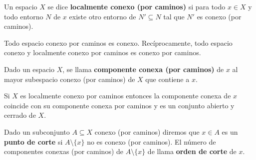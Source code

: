 \documentclass[GTS.tex]{subfiles}
\begin{document}
\begin{defi}
Un espacio $X$ se dice \textbf{localmente conexo (por caminos)} si para todo $x\in X$ y todo entorno $N$ de $x$ existe otro entorno de $N'\subseteq N$ tal que $N'$ es conexo (por caminos).
\end{defi}
\begin{prop} Todo espacio conexo por caminos es conexo. Recíprocamente, todo espacio conexo y localmente conexo por caminos es conexo por caminos.
\end{prop}

\begin{defi}
Dado un espacio $X$, se llama \textbf{componente conexa (por caminos)} de $x$ al mayor subespacio conexo (por caminos) de $X$ que contiene a $x$.
\end{defi}

\begin{prop}
Si $X$ es localmente conexo por caminos entonces la componente conexa de $x$ coincide con su componente conexa por caminos y es un conjunto abierto y cerrado de $X$.
\end{prop}

\begin{defi}Dado un subconjunto $A\subseteq X$ conexo (por caminos) diremos que $x\in A$ es un \textbf{punto de corte} si $A\setminus\{x\}$ no es conexo (por caminos). El número de componentes conexas (por caminos) de   $A\setminus\{x\}$ de llama \textbf{orden de corte} de $x$.
\end{defi}
\end{document}
